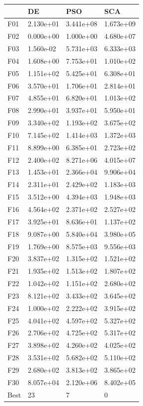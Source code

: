 \begin{tabular}{llll}
\toprule
{} &         DE &        PSO &        SCA \\
\midrule
F01  &  2.130e+01 &  3.441e+08 &  1.673e+09 \\
F02  &  0.000e+00 &  1.000e+00 &  4.680e+07 \\
F03  &  1.560e-02 &  5.731e+03 &  6.333e+03 \\
F04  &  1.608e+00 &  7.753e+01 &  1.010e+02 \\
F05  &  1.151e+02 &  5.425e+01 &  6.308e+01 \\
F06  &  3.570e+01 &  1.706e+01 &  2.814e+01 \\
F07  &  4.855e+01 &  6.820e+01 &  1.013e+02 \\
F08  &  2.990e+01 &  3.937e+01 &  5.950e+01 \\
F09  &  3.340e+02 &  1.193e+02 &  3.675e+02 \\
F10  &  7.145e+02 &  1.414e+03 &  1.372e+03 \\
F11  &  8.899e+00 &  6.385e+01 &  2.723e+02 \\
F12  &  2.400e+02 &  8.271e+06 &  4.015e+07 \\
F13  &  1.453e+01 &  2.366e+04 &  9.906e+04 \\
F14  &  2.311e+01 &  2.429e+02 &  1.183e+03 \\
F15  &  3.512e+00 &  4.394e+03 &  1.948e+03 \\
F16  &  4.564e+02 &  2.371e+02 &  2.527e+02 \\
F17  &  3.925e+01 &  8.636e+01 &  1.137e+02 \\
F18  &  9.087e+00 &  5.840e+04 &  3.980e+05 \\
F19  &  1.769e+00 &  8.575e+03 &  9.556e+03 \\
F20  &  3.837e+02 &  1.315e+02 &  1.521e+02 \\
F21  &  1.935e+02 &  1.513e+02 &  1.807e+02 \\
F22  &  1.042e+02 &  1.151e+02 &  2.680e+02 \\
F23  &  8.121e+02 &  3.433e+02 &  3.645e+02 \\
F24  &  1.000e+02 &  2.222e+02 &  3.915e+02 \\
F25  &  4.041e+02 &  4.597e+02 &  5.327e+02 \\
F26  &  2.706e+02 &  4.725e+02 &  5.317e+02 \\
F27  &  3.898e+02 &  4.260e+02 &  4.025e+02 \\
F28  &  3.531e+02 &  5.682e+02 &  5.110e+02 \\
F29  &  2.680e+02 &  3.813e+02 &  3.865e+02 \\
F30  &  8.057e+04 &  2.120e+06 &  8.402e+05 \\
Best &         23 &          7 &          0 \\
\bottomrule
\end{tabular}
